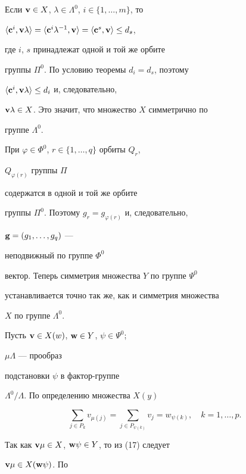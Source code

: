 \begin{pf}


Если $\bold v\in X$, $\lambda\in\Lambda^0$, $i\in\{1,\dotsc,m\}$, то


$\la\bold c^i,\bold v\lambda\ra=\la\bold c^i\lambda^{-1},\bold v\ra=


\la\bold c^s,\bold v\ra\le d_s$,


где $i$, $s$ принадлежат одной и той же орбите


группы $\Pi^0$. По условию теоремы $d_i=d_s$, поэтому


$\langle\bold c^i,\bold v\lambda\rangle\le d_i$ и, следовательно,


$\bold v\lambda\in X$. Это значит, что множество $X$ симметрично по


группе $\Lambda^0$.





При $\varphi\in\Phi^0$, $r\in\{1,\dotsc,q\}$ орбиты $Q_r$,


$Q_{\varphi(r)}$ группы $\Pi$


содержатся в одной и той же орбите


группы $\Pi^0$. Поэтому $g_r=g_{\varphi(r)}$ и, следовательно,


$\bold g=(g_1,\dotsc,g_q)$ ---


неподвижный по группе $\Phi^0$


вектор. Теперь симметрия множества $Y$ по группе $\Psi^0$


устанавливается точно так же, как и симметрия множества


$X$ по группе $\Lambda^0$.





Пусть $\bold v\in X(w)$, $\bold w\in Y$, $\psi\in\Psi^0$;


$\mu\Lambda$ --- прообраз


подстановки $\psi$ в фактор-группе


$\Lambda^0/\Lambda$. По определению множества $X(y)$


\begin{equation}


\sum_{j\in P_k}v_{\mu(j)}=\sum_{j\in P_{\psi(k)}}v_j=


w_{\psi(k)},\quad k=1,\dotsc,p.


\end{equation}


Так как $\bold v\mu\in X$, $\bold w\psi\in Y$, то из (17) следует


$\bold v\mu\in X(\bold w\psi)$. По



\end{pf}
